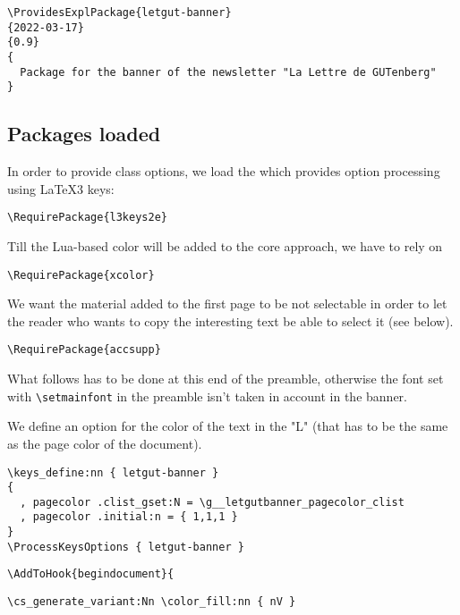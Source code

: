 \documentclass{letgut}
\begin{document}
\begin{lstlisting}
\ProvidesExplPackage{letgut-banner}
{2022-03-17}
{0.9}
{
  Package for the banner of the newsletter "La Lettre de GUTenberg"
}
\end{lstlisting}

\subsection{Packages loaded}
\label{sec:org447090b}

In order to provide class options, we load the  which provides
\LaTeXe{} option processing using \LaTeX3 keys:

\begin{lstlisting}
\RequirePackage{l3keys2e}
\end{lstlisting}

Till the Lua-based color will be  added to the core  approach,
we have to rely on 

\begin{lstlisting}
\RequirePackage{xcolor}
\end{lstlisting}

We want the material added to the first page to be not selectable in order to let the
reader who wants to copy the interesting text be able to select it (see below).

\begin{lstlisting}
\RequirePackage{accsupp}
\end{lstlisting}

What follows has to be done at this end of the preamble, otherwise the font set
with \lstinline+\setmainfont+ in the preamble isn't taken in account in the banner.

We define an option for the color of the text in the "L" (that has to be the
same as the page color of the document).

\begin{lstlisting}
\keys_define:nn { letgut-banner }
{
  , pagecolor .clist_gset:N = \g__letgutbanner_pagecolor_clist
  , pagecolor .initial:n = { 1,1,1 }
}
\ProcessKeysOptions { letgut-banner }
\end{lstlisting}

\begin{lstlisting}
\AddToHook{begindocument}{
\end{lstlisting}

\begin{lstlisting}
\cs_generate_variant:Nn \color_fill:nn { nV }
\end{lstlisting}
\end{document}
